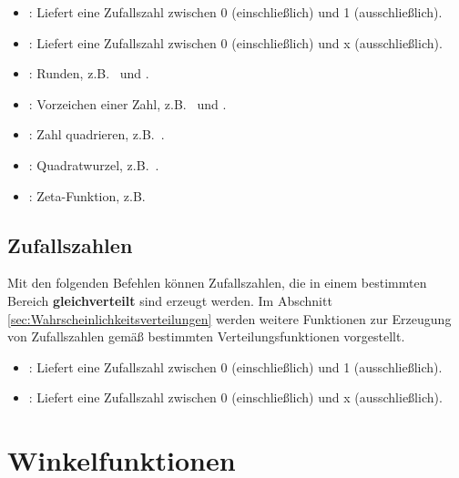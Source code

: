\begin{itemize}
\item
{}:
Liefert eine Zufallszahl zwischen 0 (einschließlich) und 1 (ausschließlich).

\item
{}:
Liefert eine Zufallszahl zwischen 0 (einschließlich) und x (ausschließlich).

\item
{}:
Runden, z.B.\  und .

\item
{}:
Vorzeichen einer Zahl, z.B.\  und .

\item
{}:
Zahl quadrieren, z.B.\ .

\item
{}:
Quadratwurzel, z.B.\ .

\item
{}:
Zeta-Funktion, z.B.\ 

\end{itemize}



\section{Zufallszahlen}

Mit den folgenden Befehlen können Zufallszahlen, die in einem bestimmten
Bereich \textbf{gleichverteilt} sind erzeugt werden. Im Abschnitt
\ref{sec:Wahrscheinlichkeitsverteilungen} werden weitere Funktionen zur
Erzeugung von Zufallszahlen gemäß bestimmten Verteilungsfunktionen vorgestellt.

\begin{itemize}

\item
{}:
Liefert eine Zufallszahl zwischen 0 (einschließlich) und 1 (ausschließlich).

\item
{}:
Liefert eine Zufallszahl zwischen 0 (einschließlich) und x (ausschließlich).

\end{itemize}





\chapter{Winkelfunktionen}\label{sec:Winkelfunktionen}

